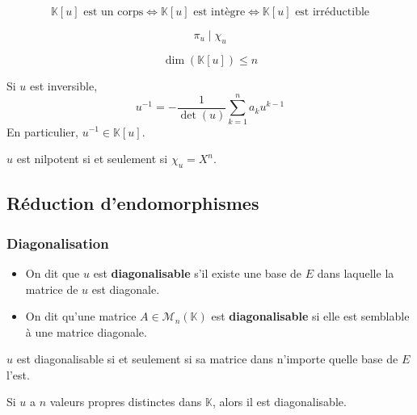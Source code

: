 	\begin{corollary}
		\[ \mathbb{K}[u] \text{ est un corps} \iff \mathbb{K}[u] \text{ est intègre} \iff \mathbb{K}[u] \text{ est irréductible} \]
	\end{corollary}
	
	\begin{theorem}
		\[ \pi_u \mid \chi_u \]
	\end{theorem}
	
	\begin{corollary}
		\[ \dim(\mathbb{K}[u]) \leq n \]
	\end{corollary}
	
	\begin{corollary}
		Si $u$ est inversible,
		\[ u^{-1} = -\frac{1}{\det(u)} \sum_{k=1}^n a_k u^{k-1} \]
		En particulier, $u^{-1} \in \mathbb{K}[u]$.
	\end{corollary}
	
	\begin{corollary}
		$u$ est nilpotent si et seulement si $\chi_u = X^n$.
	\end{corollary}
	
	\subsection{Réduction d'endomorphismes}
	
	\subsubsection{Diagonalisation}
	
	
	\begin{definition}
		\begin{itemize}
			\item On dit que $u$ est \textbf{diagonalisable} s'il existe une base de $E$ dans laquelle la matrice de $u$ est diagonale.
			\item On dit qu'une matrice $A \in \mathcal{M}_n(\mathbb{K})$ est \textbf{diagonalisable} si elle est semblable à une matrice diagonale.
		\end{itemize}
	\end{definition}
	
	\begin{remark}
		$u$ est diagonalisable si et seulement si sa matrice dans n'importe quelle base de $E$ l'est.
	\end{remark}
	
	\begin{proposition}
		Si $u$ a $n$ valeurs propres distinctes dans $\mathbb{K}$, alors il est diagonalisable.
	\end{proposition}
	
